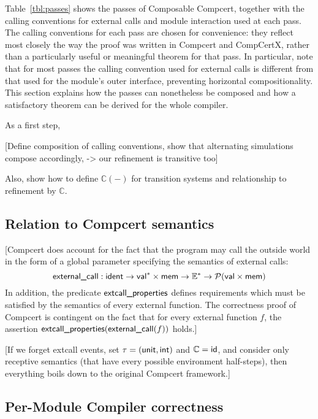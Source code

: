 Table~\ref{tbl:passes} shows the passes of Composable Compcert,
together with the calling conventions for external calls and module interaction
used at each pass.
The calling conventions for each pass are chosen for convenience:
they reflect most closely the way the proof was written
in Compcert and CompCertX,
rather than a particularly useful or meaningful theorem for that pass.
In particular,
note that for most passes
the calling convention used for external calls is different from
that used for the module's outer interface,
preventing horizontal compositionality.
This section explains how the passes can nonetheless be composed
and how a satisfactory theorem can be derived for the whole compiler.



As a first step,




[Define composition of calling conventions,
show that alternating simulations compose accordingly,
-> our refinement is transitive too]

Also, show how to define $\mathbb{C}(-)$
for transition systems
and relationship to refinement by $\mathbb{C}$.


\subsection{Relation to Compcert semantics} %

[Compcert does account for the fact that the program
may call the outside world in the form of a global parameter
specifying the semantics of external calls:
\[
   \textsf{external\_call}  :
     \textsf{ident}  \rightarrow
     \textsf{val} ^* \times  \textsf{mem}  \rightarrow
    \mathbb{E}^* \rightarrow
    \mathcal{P}( \textsf{val}  \times  \textsf{mem} )
\]
In addition,
the predicate $ \textsf{extcall\_properties} $ defines
requirements which must be satisfied by the semantics
of every external function.
The correctness proof of Compcert is contingent
on the fact that for every external function $f$,
the assertion $ \textsf{extcall\_properties} ( \textsf{external\_call} (f))$ holds.]

[If we forget extcall events,
set $\tau = ( \textsf{unit} ,  \textsf{int} )$ and $\mathbb{C} =  \textsf{id} $,
and consider only receptive semantics
(that have every possible environment half-steps),
then everything boils down to the original Compcert framework.]


\subsection{Per-Module Compiler correctness} %

